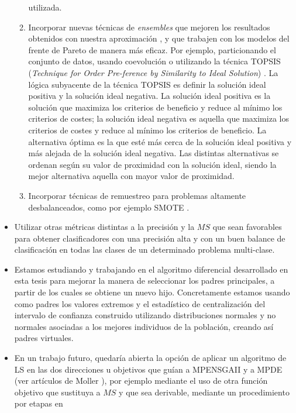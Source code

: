 \begin{itemize}
\begin{enumerate}
					utilizada.
					\item Incorporar nuevas técnicas de \textit{ensembles} que mejoren los resultados
					obtenidos con nuestra aproximación \cite{Dietterich1997,Kuncheva2005}, y que
					trabajen con los modelos del frente de Pareto de manera más eficaz. Por
					ejemplo,	particionando el conjunto de datos, usando coevolución o
					utilizando la técnica TOPSIS (\textit{Technique for Order Pre-ference by
					Similarity to Ideal Solution}) \cite{Hwang1981}. La lógica subyacente
					de la técnica TOPSIS es definir la solución ideal positiva y la solución
					ideal negativa. La	solución ideal positiva es la solución que maximiza
					los criterios de beneficio y reduce al mínimo	los criterios de costes; la
					solución ideal negativa	es aquella que maximiza los criterios de
					costes y reduce al mínimo los criterios de beneficio. La alternativa
					óptima es la que esté más cerca de la solución ideal positiva y más
					alejada	de la solución ideal negativa. Las distintas	alternativas se
					ordenan según su valor de proximidad con la solución ideal,	siendo la
					mejor alternativa aquella con mayor	valor de proximidad.
					\item Incorporar técnicas de remuestreo para	problemas altamente desbalanceados, como
					por ejemplo SMOTE \cite{Chawla2002}.
			\end{enumerate}
	\item Utilizar otras métricas distintas a la precisión y la $MS$ que sean
			favorables para obtener clasificadores con una precisión alta y con un buen balance de
			clasificación en todas las clases de un determinado problema multi-clase.
	\item Estamos estudiando y trabajando en el algoritmo diferencial desarrollado en esta tesis
			para mejorar la			manera de			seleccionar los padres	principales, a partir de
			los cuales se obtiene un			nuevo hijo. Concretamente
			estamos usando	como padres los valores extremos y el estadístico de centralización del
			intervalo de confianza construido utilizando distribuciones normales y no
normales
			asociadas a los mejores individuos de la población, creando así padres virtuales.
	 \item En un trabajo futuro, quedaría abierta la opción de aplicar un algoritmo de LS en las
			dos direcciones u objetivos que guían a MPENSGAII y a MPDE (ver artículos
			de Moller \cite{Moller1993,Falas2005}), por ejemplo mediante el uso de otra función
			objetivo que sustituya a $MS$ y que sea derivable, mediante un procedimiento por etapas en

\end{itemize}
